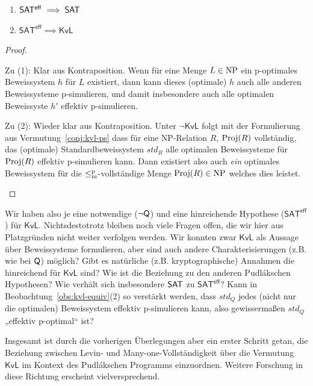 \begin{theorem}\label{thm:sateff-generalizes-sat}
    \begin{enumerate}
        \item $\mathsf{SAT^{eff}}\implies \mathsf{SAT}$
        \item $\mathsf{SAT^{eff}}\implies \mathsf{KvL}$
    \end{enumerate}
\end{theorem}
\begin{proof}
\begin{prooflist}
\item Zu (1): Klar aus Kontraposition. Wenn für eine Menge $L\in\mathrm{NP}$ ein p-optimales Beweissystem $h$ für $L$ existiert, dann kann dieses (optimale) $h$ auch alle anderen Beweissysteme p-simulieren, und damit insbesondere auch alle optimalen Beweissyste $h'$ effektiv p-simulieren.

\item Zu (2): Wieder klar aus Kontraposition. Unter $\neg\mathsf{KvL}$ folgt mit der Formulierung aus Vermutung~\ref{conj:kvl-ps} dass für eine NP-Relation $R$, $\operatorname{Proj}(R)$ vollständig, das (optimale) Standardbeweissystem $\mathit{std}_R$ alle optimalen Beweissysteme für $\operatorname{Proj}(R)$ effektiv p-simulieren kann. Dann existiert also auch \emph{ein} optimales Beweissystem für die $\leq_\mathrm{m}^\mathrm{p}$-vollständige Menge $\operatorname{Proj}(R)\in\mathrm{NP}$ welches dies leistet.
\end{prooflist}
\end{proof}

Wir haben also je eine notwendige ($\neg\mathsf{Q}$) und eine hinreichende Hypothese ($\mathsf{SAT^{eff}}$) für $\mathsf{KvL}$. 
Nichtsdestotrotz bleiben noch viele Fragen offen, die wir hier aus Platzgründen nicht weiter verfolgen werden. 
Wir konnten zwar $\mathsf{KvL}$ als Aussage über Beweissysteme formulieren, aber sind auch andere Charakterisierungen (z.B. wie bei $\mathsf{Q}$) möglich?
Gibt es natürliche (z.B. kryptographische) Annahmen die hinreichend für $\mathsf{KvL}$ sind? Wie ist die Beziehung zu den anderen Pudlákschen Hypothesen? Wie verhält sich insbesondere $\mathsf{SAT}$ zu $\mathsf{SAT^{eff}}$? 
Kann in Beobachtung~\ref{obs:kvl-equiv}(2) so verstärkt werden, dass $\mathit{std}_Q$ jedes (nicht nur die optimalen) Beweissystem effektiv p-simulieren kann, also gewissermaßen $\mathit{std}_Q$ „effektiv p-optimal“ ist?

Insgesamt ist durch die vorherigen Überlegungen aber ein erster Schritt getan, die Beziehung zwischen Levin- und Many-one-Vollständigkeit über die Vermutung $\mathsf{KvL}$ im Kontext des Pudlákschen Programms einzuordnen.
Weitere Forschung in diese Richtung erscheint vielversprechend.

